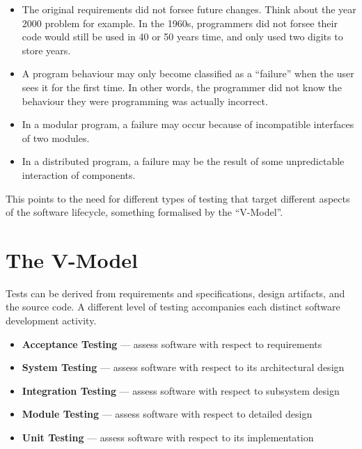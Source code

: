 \begin{itemize}
    \item The original requirements did not forsee future changes. Think about
    the year 2000 problem for example. In the 1960s, programmers did not forsee
    their code would still be used in 40 or 50 years time, and only used two
    digits to store years.

    \item A program behaviour may only become classified as a ``failure'' when
    the user sees it for the first time. In other words, the programmer did not
    know the behaviour they were programming was actually incorrect.

    \item In a modular program, a failure may occur because of incompatible
    interfaces of two modules.

    \item In a distributed program, a failure may be the result of some
    unpredictable interaction of components. 

\end{itemize}

This points to the need for different types of testing that target different
aspects of the software lifecycle, something formalised by the ``V-Model''.


\section{The V-Model}


Tests can be derived from requirements and specifications, design artifacts, and
the source code. A different level of testing accompanies each distinct software
development activity. 


\begin{itemize}

    \item {\bf Acceptance Testing} --- assess software with respect to requirements
    
    \item {\bf System Testing} --- assess software with respect to its
    architectural design 

    \item {\bf Integration Testing} --- assess software with respect to
    subsystem design

    \item {\bf Module Testing} --- assess software with respect to detailed design
    
    \item {\bf Unit Testing} --- assess software with respect to its implementation

\end{itemize}

